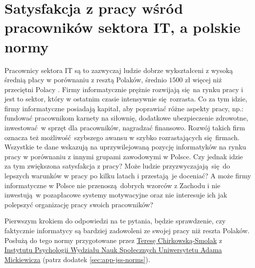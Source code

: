 \section{Satysfakcja z pracy wśród pracowników sektora IT, a polskie normy}
\label{sec:hip-sat-norms}
Pracownicy sektora IT są to zazwyczaj ludzie dobrze wykształceni z wysoką średnią płacy w porównaniu z resztą Polaków, średnio $1500$ zł więcej niż przeciętni Polacy \cite{web:earnings-it,web:earnings-pl}. Firmy informatycznie prężnie rozwijają się na rynku pracy i jest to sektor, który w ostatnim czasie intensywnie się rozrasta. Co za tym idzie, firmy informatyczne posiadają kapitał, aby poprawiać różne aspekty pracy, np.: fundować pracownikom karnety na siłownię, dodatkowe ubezpieczenie zdrowotne, inwestować w sprzęt dla pracowników, nagradzać
finansowo. Rozwój takich firm oznacza też możliwość szybszego awansu w szybko rozrastających się firmach. Wszystkie te dane wskazują na uprzywilejowaną pozycję informatyków na rynku pracy w porównaniu z innymi grupami zawodowymi w Polsce. Czy jednak idzie za tym zwiększona satysfakcja z pracy? Może ludzie przyzwyczajają się do lepszych warunków w pracy po kilku latach i przestają je doceniać? A może firmy informatyczne w Polsce nie
przenoszą dobrych wzorców z Zachodu i nie inwestują w pozapłacowe systemy motywacyjne oraz nie interesuje ich jak polepszyć organizację pracy swoich pracowników?

Pierwszym krokiem do odpowiedzi na te pytania, będzie sprawdzenie, czy faktycznie informatycy są bardziej zadowoleni ze swojej pracy niż reszta Polaków. Posłużą do tego normy przygotowane przez
\href{http://www.psychologia.amu.edu.pl/ip-uam/struktura-zatrudnienia-w-instytucie/curriculum-vitae-teresa-chirkowska-smolak/}{Teresę Chirkowską-Smolak} z \href{http://www.psychologia.amu.edu.pl/}{Instytutu Psychologii Wydziału Nauk Społecznych Uniwersytetu Adama Mickiewicza} (patrz dodatek \ref{sec:app-jss-norms}).

